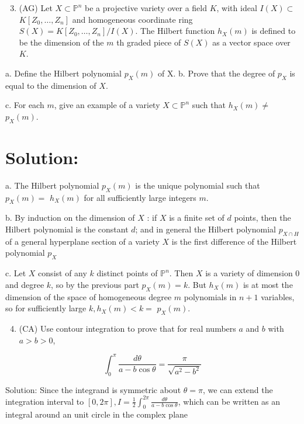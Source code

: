\documentclass[10pt]{article}
\begin{document}
\begin{enumerate}
  \setcounter{enumi}{2}
  \item (AG) Let $X \subset \mathbb{P}^{n}$ be a projective variety over a field $K$, with ideal $I(X) \subset$ $K\left[Z_{0}, \ldots, Z_{n}\right]$ and homogeneous coordinate ring $S(X)=K\left[Z_{0}, \ldots, Z_{n}\right] / I(X)$. The Hilbert function $h_{X}(m)$ is defined to be the dimension of the $m$ th graded piece of $S(X)$ as a vector space over $K$.
\end{enumerate}

a. Define the Hilbert polynomial $p_{X}(m)$ of $\mathrm{X}$.
b. Prove that the degree of $p_{X}$ is equal to the dimension of $X$.

c. For each $m$, give an example of a variety $X \subset \mathbb{P}^{n}$ such that $h_{X}(m) \neq$ $p_{X}(m)$.

\section{Solution:}
a. The Hilbert polynomial $p_{X}(m)$ is the unique polynomial such that $p_{X}(m)=$ $h_{X}(m)$ for all sufficiently large integers $m$.

b. By induction on the dimension of $X$ : if $X$ is a finite set of $d$ points, then the Hilbert polynomial is the constant $d$; and in general the Hilbert polynomial $p_{X \cap H}$ of a general hyperplane section of a variety $X$ is the first difference of the Hilbert polynomial $p_{X}$

c. Let $X$ consist of any $k$ distinct points of $\mathbb{P}^{n}$. Then $X$ is a variety of dimension 0 and degree $k$, so by the previous part $p_{X}(m)=k$. But $h_{X}(m)$ is at most the dimension of the space of homogeneous degree $m$ polynomials in $n+1$ variables, so for sufficiently large $k, h_{X}(m)<k=$ $p_{X}(m)$.

\begin{enumerate}
  \setcounter{enumi}{3}
  \item (CA) Use contour integration to prove that for real numbers $a$ and $b$ with $a>b>0$,
\end{enumerate}

$$
\int_{0}^{\pi} \frac{d \theta}{a-b \cos \theta}=\frac{\pi}{\sqrt{a^{2}-b^{2}}}
$$

Solution: Since the integrand is symmetric about $\theta=\pi$, we can extend the integration interval to $[0,2 \pi], I=\frac{1}{2} \int_{0}^{2 \pi} \frac{d \theta}{a-b \cos \theta}$, which can be written as an integral around an unit circle in the complex plane
\end{document}
